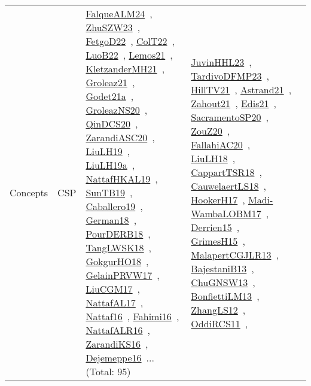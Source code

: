 {\begin{longtable}{lp{3cm}>{\raggedright\arraybackslash}p{6cm}>{\raggedright\arraybackslash}p{6cm}>{\raggedright\arraybackslash}p{8cm}}
\index{CSP}\index{Concepts!CSP}Concepts & CSP & \href{../works/FalqueALM24.pdf}{FalqueALM24}~\cite{FalqueALM24}, \href{../works/ZhuSZW23.pdf}{ZhuSZW23}~\cite{ZhuSZW23}, \href{../works/FetgoD22.pdf}{FetgoD22}~\cite{FetgoD22}, \href{../works/ColT22.pdf}{ColT22}~\cite{ColT22}, \href{../works/LuoB22.pdf}{LuoB22}~\cite{LuoB22}, \href{../works/Lemos21.pdf}{Lemos21}~\cite{Lemos21}, \href{../works/KletzanderMH21.pdf}{KletzanderMH21}~\cite{KletzanderMH21}, \href{../works/Groleaz21.pdf}{Groleaz21}~\cite{Groleaz21}, \href{../works/Godet21a.pdf}{Godet21a}~\cite{Godet21a}, \href{../works/GroleazNS20.pdf}{GroleazNS20}~\cite{GroleazNS20}, \href{../works/QinDCS20.pdf}{QinDCS20}~\cite{QinDCS20}, \href{../works/ZarandiASC20.pdf}{ZarandiASC20}~\cite{ZarandiASC20}, \href{../works/LiuLH19.pdf}{LiuLH19}~\cite{LiuLH19}, \href{../works/LiuLH19a.pdf}{LiuLH19a}~\cite{LiuLH19a}, \href{../works/NattafHKAL19.pdf}{NattafHKAL19}~\cite{NattafHKAL19}, \href{../works/SunTB19.pdf}{SunTB19}~\cite{SunTB19}, \href{../works/Caballero19.pdf}{Caballero19}~\cite{Caballero19}, \href{../works/German18.pdf}{German18}~\cite{German18}, \href{../works/PourDERB18.pdf}{PourDERB18}~\cite{PourDERB18}, \href{../works/TangLWSK18.pdf}{TangLWSK18}~\cite{TangLWSK18}, \href{../works/GokgurHO18.pdf}{GokgurHO18}~\cite{GokgurHO18}, \href{../works/GelainPRVW17.pdf}{GelainPRVW17}~\cite{GelainPRVW17}, \href{../works/LiuCGM17.pdf}{LiuCGM17}~\cite{LiuCGM17}, \href{../works/NattafAL17.pdf}{NattafAL17}~\cite{NattafAL17}, \href{../works/Nattaf16.pdf}{Nattaf16}~\cite{Nattaf16}, \href{../works/Fahimi16.pdf}{Fahimi16}~\cite{Fahimi16}, \href{../works/NattafALR16.pdf}{NattafALR16}~\cite{NattafALR16}, \href{../works/ZarandiKS16.pdf}{ZarandiKS16}~\cite{ZarandiKS16}, \href{../works/Dejemeppe16.pdf}{Dejemeppe16}~\cite{Dejemeppe16}... (Total: 95) & \href{../works/JuvinHHL23.pdf}{JuvinHHL23}~\cite{JuvinHHL23}, \href{../works/TardivoDFMP23.pdf}{TardivoDFMP23}~\cite{TardivoDFMP23}, \href{../works/HillTV21.pdf}{HillTV21}~\cite{HillTV21}, \href{../works/Astrand21.pdf}{Astrand21}~\cite{Astrand21}, \href{../works/Zahout21.pdf}{Zahout21}~\cite{Zahout21}, \href{../works/Edis21.pdf}{Edis21}~\cite{Edis21}, \href{../works/SacramentoSP20.pdf}{SacramentoSP20}~\cite{SacramentoSP20}, \href{../works/ZouZ20.pdf}{ZouZ20}~\cite{ZouZ20}, \href{../works/FallahiAC20.pdf}{FallahiAC20}~\cite{FallahiAC20}, \href{../works/LiuLH18.pdf}{LiuLH18}~\cite{LiuLH18}, \href{../works/CappartTSR18.pdf}{CappartTSR18}~\cite{CappartTSR18}, \href{../works/CauwelaertLS18.pdf}{CauwelaertLS18}~\cite{CauwelaertLS18}, \href{../works/HookerH17.pdf}{HookerH17}~\cite{HookerH17}, \href{../works/Madi-WambaLOBM17.pdf}{Madi-WambaLOBM17}~\cite{Madi-WambaLOBM17}, \href{../works/Derrien15.pdf}{Derrien15}~\cite{Derrien15}, \href{../works/GrimesH15.pdf}{GrimesH15}~\cite{GrimesH15}, \href{../works/MalapertCGJLR13.pdf}{MalapertCGJLR13}~\cite{MalapertCGJLR13}, \href{../works/BajestaniB13.pdf}{BajestaniB13}~\cite{BajestaniB13}, \href{../works/ChuGNSW13.pdf}{ChuGNSW13}~\cite{ChuGNSW13}, \href{../works/BonfiettiLM13.pdf}{BonfiettiLM13}~\cite{BonfiettiLM13}, \href{../works/ZhangLS12.pdf}{ZhangLS12}~\cite{ZhangLS12}, \href{../works/OddiRCS11.pdf}{OddiRCS11}~\cite{OddiRCS11}, 
\end{longtable}}
